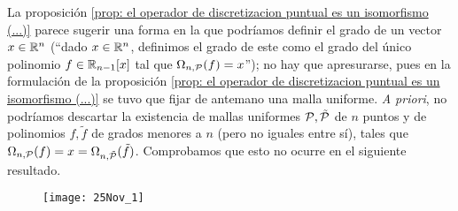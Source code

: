 La proposición
\ref{prop: el operador de discretizacion puntual es un isomorfismo (...)}
parece sugerir 
una forma en la que podríamos 
definir el grado de 
un vector $x \in \mathbb{R}^{n}$ (``dado $x \in \mathbb{R}^{n}$, definimos
el grado de este como el grado del único polinomio $f \in \mathbb{R}_{n-1}[x]$
tal que $\Omega_{n, \mathcal{P}}(f)=x$''); no hay
que apresurarse, pues en la formulación de
la proposición
\ref{prop: el operador de discretizacion puntual es un isomorfismo (...)}
se tuvo que fijar de antemano una malla uniforme.
\textit{A priori}, no podríamos descartar 
la existencia de mallas uniformes
$\mathcal{P}, \tilde{\mathcal{P}}$ 
de $n$ puntos
y de polinomios
$f, \tilde{f}$ de grados menores a $n$ (pero no 
iguales entre sí), tales que
$\Omega_{n, \mathcal{P}}(f) = x = \Omega_{n, \tilde{\mathcal{P}}}(\tilde{f})$.
Comprobamos que esto no ocurre
en el siguiente resultado.


\begin{figure}[H]
	\centering
	\texttt{[image: 25Nov\_1]} 
\end{figure}	


